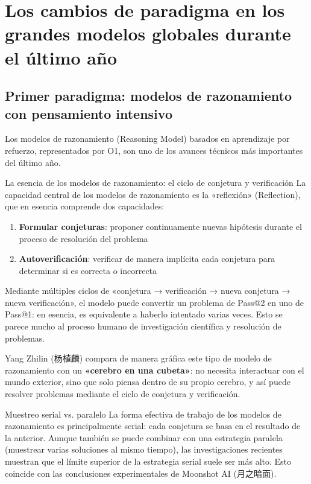 \section{Los cambios de paradigma en los grandes modelos globales durante el último año}

\subsection{Primer paradigma: modelos de razonamiento con pensamiento intensivo}

Los modelos de razonamiento (Reasoning Model) basados en aprendizaje por refuerzo, representados por O1, son uno de los avances técnicos más importantes del último año.

\begin{importantbox}{La esencia de los modelos de razonamiento: el ciclo de conjetura y verificación}
La capacidad central de los modelos de razonamiento es la «reflexión» (Reflection), que en esencia comprende dos capacidades:
\begin{enumerate}
    \item \textbf{Formular conjeturas}: proponer continuamente nuevas hipótesis durante el proceso de resolución del problema
    \item \textbf{Autoverificación}: verificar de manera implícita cada conjetura para determinar si es correcta o incorrecta
\end{enumerate}
Mediante múltiples ciclos de «conjetura → verificación → nueva conjetura → nueva verificación», el modelo puede convertir un problema de Pass@2 en uno de Pass@1: en esencia, es equivalente a haberlo intentado varias veces. Esto se parece mucho al proceso humano de investigación científica y resolución de problemas.
\end{importantbox}

Yang Zhilin (杨植麟) compara de manera gráfica este tipo de modelo de razonamiento con un \textbf{«cerebro en una cubeta»}: no necesita interactuar con el mundo exterior, sino que solo piensa dentro de su propio cerebro, y así puede resolver problemas mediante el ciclo de conjetura y verificación.

\begin{knowledgebox}{Muestreo serial vs. paralelo}
La forma efectiva de trabajo de los modelos de razonamiento es principalmente serial: cada conjetura se basa en el resultado de la anterior. Aunque también se puede combinar con una estrategia paralela (muestrear varias soluciones al mismo tiempo), las investigaciones recientes muestran que el límite superior de la estrategia serial suele ser más alto. Esto coincide con las conclusiones experimentales de Moonshot AI (月之暗面).
\end{knowledgebox}

